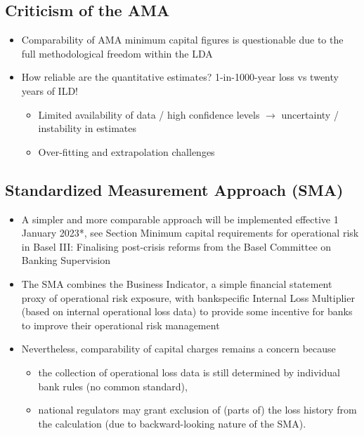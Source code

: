 \subsection*{Criticism of the AMA}
\begin{itemize}[leftmargin=*]
    \item Comparability of AMA minimum capital figures is questionable due to the full methodological freedom within the LDA
    \item How reliable are the quantitative estimates? 1-in-1000-year loss vs twenty years of ILD!
    
    \begin{itemize}[leftmargin=*]
    \item Limited availability of data / high confidence levels $\rightarrow$ uncertainty / instability in estimates
    \item Over-fitting and extrapolation challenges
    \end{itemize}
\end{itemize}




\subsection*{Standardized Measurement Approach (SMA)}
\begin{itemize}[leftmargin=*]
    \item A simpler and more comparable approach will be implemented effective 1 January 2023*, see Section Minimum capital
requirements for operational risk in Basel III: Finalising post-crisis reforms from the Basel Committee on Banking Supervision
    \item The SMA combines the Business Indicator, a simple financial statement proxy of operational risk exposure, with bankspecific
Internal Loss Multiplier (based on internal operational loss data) to provide some incentive for banks to improve
their operational risk management
    \item Nevertheless, comparability of capital charges remains a concern because
    \begin{itemize}[leftmargin=*]
    \item the collection of operational loss data is still determined by individual bank rules (no common standard),
    \item national regulators may grant exclusion of (parts of) the loss history from the calculation (due to backward-looking nature of the SMA).
    \end{itemize}
\end{itemize}






